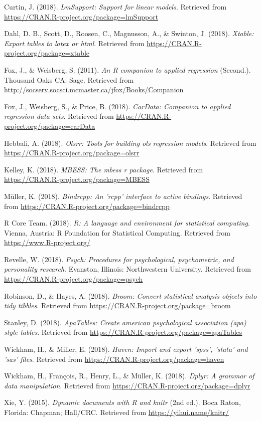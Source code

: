 \documentclass[man,floatsintext]{apa6}
\begin{document}
\hypertarget{ref-R-lmSupport}{}
Curtin, J. (2018). \emph{LmSupport: Support for linear models}.
Retrieved from \url{https://CRAN.R-project.org/package=lmSupport}

\hypertarget{ref-R-xtable}{}
Dahl, D. B., Scott, D., Roosen, C., Magnusson, A., \& Swinton, J.
(2018). \emph{Xtable: Export tables to latex or html}. Retrieved from
\url{https://CRAN.R-project.org/package=xtable}

\hypertarget{ref-R-car}{}
Fox, J., \& Weisberg, S. (2011). \emph{An R companion to applied
regression} (Second.). Thousand Oaks CA: Sage. Retrieved from
\url{http://socserv.socsci.mcmaster.ca/jfox/Books/Companion}

\hypertarget{ref-R-carData}{}
Fox, J., Weisberg, S., \& Price, B. (2018). \emph{CarData: Companion to
applied regression data sets}. Retrieved from
\url{https://CRAN.R-project.org/package=carData}

\hypertarget{ref-R-olsrr}{}
Hebbali, A. (2018). \emph{Olsrr: Tools for building ols regression
models}. Retrieved from \url{https://CRAN.R-project.org/package=olsrr}

\hypertarget{ref-R-MBESS}{}
Kelley, K. (2018). \emph{MBESS: The mbess r package}. Retrieved from
\url{https://CRAN.R-project.org/package=MBESS}

\hypertarget{ref-R-bindrcpp}{}
Müller, K. (2018). \emph{Bindrcpp: An 'rcpp' interface to active
bindings}. Retrieved from
\url{https://CRAN.R-project.org/package=bindrcpp}

\hypertarget{ref-R-base}{}
R Core Team. (2018). \emph{R: A language and environment for statistical
computing}. Vienna, Austria: R Foundation for Statistical Computing.
Retrieved from \url{https://www.R-project.org/}

\hypertarget{ref-R-psych}{}
Revelle, W. (2018). \emph{Psych: Procedures for psychological,
psychometric, and personality research}. Evanston, Illinois:
Northwestern University. Retrieved from
\url{https://CRAN.R-project.org/package=psych}

\hypertarget{ref-R-broom}{}
Robinson, D., \& Hayes, A. (2018). \emph{Broom: Convert statistical
analysis objects into tidy tibbles}. Retrieved from
\url{https://CRAN.R-project.org/package=broom}

\hypertarget{ref-R-apaTables}{}
Stanley, D. (2018). \emph{ApaTables: Create american psychological
association (apa) style tables}. Retrieved from
\url{https://CRAN.R-project.org/package=apaTables}

\hypertarget{ref-R-haven}{}
Wickham, H., \& Miller, E. (2018). \emph{Haven: Import and export
'spss', 'stata' and 'sas' files}. Retrieved from
\url{https://CRAN.R-project.org/package=haven}

\hypertarget{ref-R-dplyr}{}
Wickham, H., François, R., Henry, L., \& Müller, K. (2018). \emph{Dplyr:
A grammar of data manipulation}. Retrieved from
\url{https://CRAN.R-project.org/package=dplyr}

\hypertarget{ref-R-knitr}{}
Xie, Y. (2015). \emph{Dynamic documents with R and knitr} (2nd ed.).
Boca Raton, Florida: Chapman; Hall/CRC. Retrieved from
\url{https://yihui.name/knitr/}

\endgroup
\end{document}
